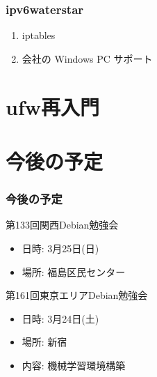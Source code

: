 \documentclass[cjk,dvipdfmx,10pt,compress,%
hyperref={bookmarks=true,bookmarksnumbered=true,bookmarksopen=false,%
colorlinks=false,%
pdftitle={第 132 回 関西 Debian 勉強会},%
pdfauthor={かわだ},%
pdfsubject={資料},%
}]{beamer}
\begin{document}
\begin{frame}
  \frametitle{ ipv6waterstar }
  \begin{enumerate}
  \item iptables
  \item 会社の Windows PC サポート
  \end{enumerate}
\end{frame}



\section{ufw再入門}


\section{今後の予定}
\begin{frame}[fragile]
  \frametitle{今後の予定}

  \begin{block}{第133回関西Debian勉強会}
    \begin{itemize}
    \item 日時: 3月25日(日)
    \item 場所: 福島区民センター
    \end{itemize}
  \end{block}

  \begin{block}{第161回東京エリアDebian勉強会}
    \begin{itemize}
    \item 日時: 3月24日(土)
    \item 場所: 新宿
    \item 内容: 機械学習環境構築
    \end{itemize}
  \end{block}

\end{frame}

\takahashi[50]{  }
\end{document}
